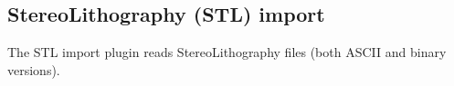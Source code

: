
\subsection{StereoLithography (STL) import}

The STL import plugin reads StereoLithography files (both ASCII and binary
versions).


